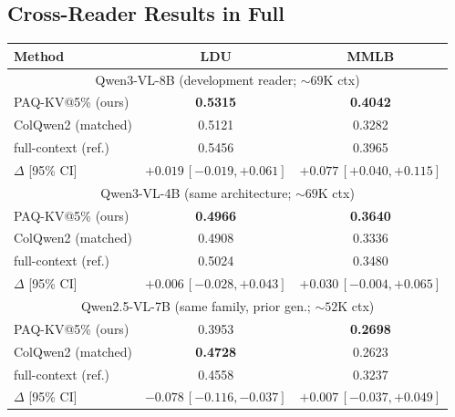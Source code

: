 \documentclass[letterpaper]{article} %
\newcommand{\paqc}{\textsc{PAQ-KV}}
\begin{document}
\subsection{Cross-Reader Results in Full}\label{app:crossreader-table}

\begin{table}[t]
\centering\scriptsize
\setlength{\tabcolsep}{2pt}%
\begin{tabular}{lcc}
\toprule
Method & LDU & MMLB \\
\midrule
\multicolumn{3}{c}{Qwen3-VL-8B (development reader; ${\sim}69$K ctx)} \\
\midrule
\paqc{}@5\% (ours) & \textbf{0.5315} & \textbf{0.4042} \\
ColQwen2 (matched) & 0.5121 & 0.3282 \\
full-context (ref.) & 0.5456 & 0.3965 \\
$\Delta$ [95\% CI] & $+0.019\,[-0.019,+0.061]$ & $+0.077\,[+0.040,+0.115]$ \\
\midrule
\multicolumn{3}{c}{Qwen3-VL-4B (same architecture; ${\sim}69$K ctx)} \\
\midrule
\paqc{}@5\% (ours) & \textbf{0.4966} & \textbf{0.3640} \\
ColQwen2 (matched) & 0.4908 & 0.3336 \\
full-context (ref.) & 0.5024 & 0.3480 \\
$\Delta$ [95\% CI] & $+0.006\,[-0.028,+0.043]$ & $+0.030\,[-0.004,+0.065]$ \\
\midrule
\multicolumn{3}{c}{Qwen2.5-VL-7B (same family, prior gen.; ${\sim}52$K ctx)} \\
\midrule
\paqc{}@5\% (ours) & 0.3953 & \textbf{0.2698} \\
ColQwen2 (matched) & \textbf{0.4728} & 0.2623 \\
full-context (ref.) & 0.4558 & 0.3237 \\
$\Delta$ [95\% CI] & $-0.078\,[-0.116,-0.037]$ & $+0.007\,[-0.037,+0.049]$ \\

\end{tabular}
\end{table}
\end{document}
